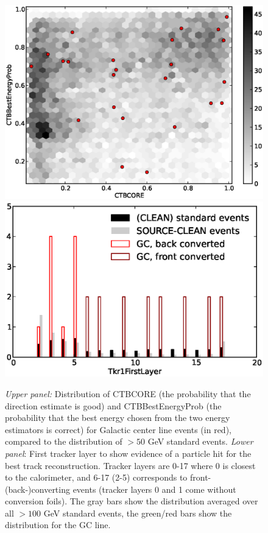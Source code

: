 \documentclass[aps,twocolumn,prd,superscriptaddress,showpacs,nofootinbib,fixfloat]{revtex4}
\begin{document}
\begin{figure}
  \centering
  \includegraphics[width=1.00\linewidth]{plots/CTBCORE_CTBBestEnergyProb.eps}
  \includegraphics[width=1.00\linewidth]{plots/Tkr1FirstLayer.eps}
  \caption{\emph{Upper panel:} Distribution of CTBCORE (the
  probability that the direction estimate is good) and
  CTBBestEnergyProb (the probability that the best energy
  chosen from the two energy estimators is correct) for
  Galactic center line events (in red), compared to the
  distribution of $>50$ GeV standard events.  \emph{Lower
  panel}: First tracker layer to show evidence of a particle
  hit for the best track reconstruction. Tracker layers are
  0-17 where 0 is closest to the calorimeter, and 6-17 (2-5)
  corresponds to front- (back-)converting events (tracker
  layers 0 and 1 come without conversion foils). The gray
  bars show the distribution averaged over all $>100$ GeV
  standard events, the green/red bars show the distribution
  for the GC line.}
  \label{fig:CTBquality}
\end{figure}
\end{document}
